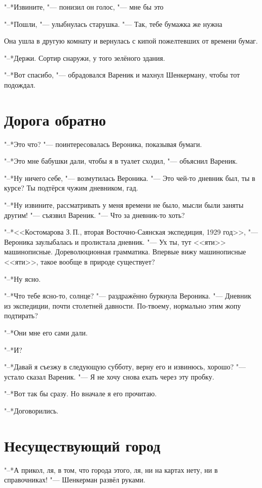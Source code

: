 "--*Извините, "--- понизил он голос, "--- мне бы это\ldotst

"--*Пошли, "--- улыбнулась старушка.
"--- Так, тебе бумажка же нужна\ldotsq

Она ушла в другую комнату и вернулась с кипой пожелтевших от времени бумаг.

"--*Держи.
Сортир снаружи, у того зелёного здания.

"--*Вот спасибо, "--- обрадовался Вареник и махнул Шенкерману, чтобы тот подождал.

\section{Дорога обратно}

"--*Это что? "--- поинтересовалась Вероника, показывая бумаги.

"--*Это мне бабушки дали, чтобы я в туалет сходил, "--- объяснил Вареник.

"--*Ну ничего себе, "--- возмутилась Вероника.
"--- Это чей-то дневник был, ты в курсе?
Ты подтёрся чужим дневником, гад.

"--*Ну извините, рассматривать у меня времени не было, мысли были заняты другим! "--- съязвил Вареник.
"--- Что за дневник-то хоть?

"--*<<Костомарова З.\,П., вторая Восточно-Саянская экспедиция, 1929 год>>, "--- Вероника заулыбалась и пролистала дневник.
"--- Ух ты, тут <<яти>> машинописные.
Дореволюционная грамматика.
Впервые вижу машинописные <<яти>>, такое вообще в природе существует?

"--*Ну ясно.

"--*Что тебе ясно-то, солнце? "--- раздражённо буркнула Вероника.
"--- Дневник из экспедиции, почти столетней давности.
По-твоему, нормально этим жопу подтирать?

"--*Они мне его сами дали.

"--*И?

"--*Давай я съезжу в следующую субботу, верну его и извинюсь, хорошо? "--- устало сказал Вареник.
"--- Я не хочу снова ехать через эту пробку.

"--*Вот так бы сразу.
Но вначале я его прочитаю.

"--*Договорились.

\section{Несуществующий город}

"--*А прикол, ля, в том, что города этого, ля, ни на картах нету, ни в справочниках! "--- Шенкерман развёл руками.

